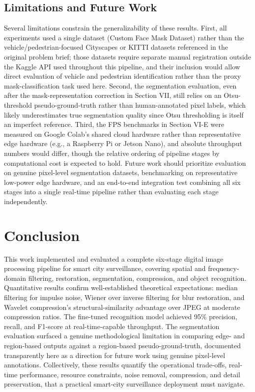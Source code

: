 \documentclass[conference]{IEEEtran}
\begin{document}
\subsection{Limitations and Future Work}
Several limitations constrain the generalizability of these results. First, all experiments used a single dataset (Custom Face Mask Dataset) rather than the vehicle/pedestrian-focused Cityscapes or KITTI datasets referenced in the original problem brief; those datasets require separate manual registration outside the Kaggle API used throughout this pipeline, and their inclusion would allow direct evaluation of vehicle and pedestrian identification rather than the proxy mask-classification task used here. Second, the segmentation evaluation, even after the mask-representation correction in Section VII, still relies on an Otsu-threshold pseudo-ground-truth rather than human-annotated pixel labels, which likely underestimates true segmentation quality since Otsu thresholding is itself an imperfect reference. Third, the FPS benchmarks in Section VI-E were measured on Google Colab's shared cloud hardware rather than representative edge hardware (e.g., a Raspberry Pi or Jetson Nano), and absolute throughput numbers would differ, though the relative ordering of pipeline stages by computational cost is expected to hold. Future work should prioritize evaluation on genuine pixel-level segmentation datasets, benchmarking on representative low-power edge hardware, and an end-to-end integration test combining all six stages into a single real-time pipeline rather than evaluating each stage independently.

\section{Conclusion}
This work implemented and evaluated a complete six-stage digital image processing pipeline for smart city surveillance, covering spatial and frequency-domain filtering, restoration, segmentation, compression, and object recognition. Quantitative results confirm well-established theoretical expectations: median filtering for impulse noise, Wiener over inverse filtering for blur restoration, and Wavelet compression's structural-similarity advantage over JPEG at moderate compression ratios. The fine-tuned recognition model achieved 95\% precision, recall, and F1-score at real-time-capable throughput. The segmentation evaluation surfaced a genuine methodological limitation in comparing edge- and region-based outputs against a region-based pseudo-ground-truth, documented transparently here as a direction for future work using genuine pixel-level annotations. Collectively, these results quantify the operational trade-offs, real-time performance, resource constraints, noise removal, compression, and detail preservation, that a practical smart-city surveillance deployment must navigate.
\end{document}
